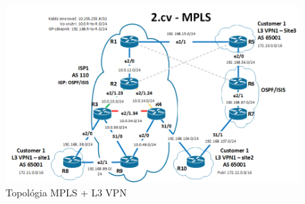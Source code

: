\documentclass[12pt,twoside,a4paper]{report}
\begin{document}
\begin{figure}[!htbp]
\centering
\includegraphics[width=14cm,keepaspectratio]{mpls_l3vpn_topo}
\caption{Topológia MPLS + L3 VPN}
\label{fig:mpls_l3vpn_topo}
\end{figure}



\clearpage
\end{document}
